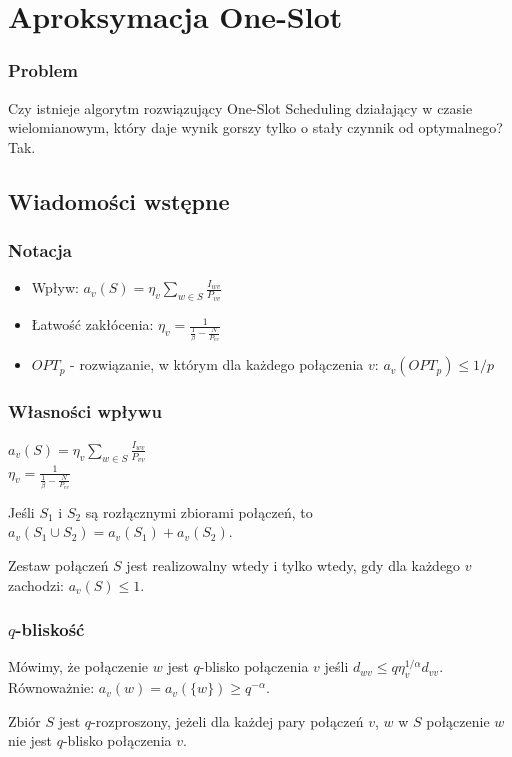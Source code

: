\documentclass[polish, t,10pt]{beamer}
\begin{document}
\section{Aproksymacja One-Slot}
\begin{frame}
    \frametitle{Problem}
        Czy istnieje algorytm rozwiązujący One-Slot Scheduling działający w czasie wielomianowym,
        który daje wynik gorszy tylko o stały czynnik od optymalnego?
        \pause
        \vfill
        Tak.
\end{frame}

\subsection{Wiadomości wstępne}
\begin{frame}
    \frametitle{Notacja}
    \begin{itemize}
        \item Wpływ: $a_v(S) = \eta_v \sum_{w \in S} \frac{I_{wv}}{P_{vv}}$
        \item Łatwość zakłócenia: $\eta_v = \frac{1}{\frac{1}{\beta} - \frac{N}{P_{vv}}}$
        \item $OPT_p$ - rozwiązanie, w którym dla każdego połączenia $v$: $a_v(OPT_p) \le 1/p$
    \end{itemize}
\end{frame}

\begin{frame}
    \frametitle{Własności wpływu}
    \begin{definition}
        $a_v(S) = \eta_v \sum_{w \in S} \frac{I_{wv}}{P_{vv}}$\\
        $\eta_v = \frac{1}{\frac{1}{\beta} - \frac{N}{P_{vv}}}$
    \end{definition}
    \begin{lemma}
        Jeśli $S_1$ i $S_2$ są rozłącznymi zbiorami połączeń, to $a_v(S_1 \cup S_2) = a_v(S_1) + a_v(S_2)$.
    \end{lemma}
    \begin{lemma}
        Zestaw połączeń $S$ jest realizowalny wtedy i tylko wtedy, gdy dla każdego $v$ zachodzi:
        $a_v(S) \le 1$.
    \end{lemma}
\end{frame}

\begin{frame}
    \frametitle{$q$-bliskość}
    \begin{definition}
        Mówimy, że połączenie $w$ jest $q$-blisko połączenia $v$ jeśli $d_{wv} \le q \eta_v^{1/\alpha} d_{vv}$.
        Równoważnie: $a_v(w) = a_v(\{w\}) \ge q^{-\alpha}$.
    \end{definition}

    \begin{definition}
        Zbiór $S$ jest $q$-rozproszony, jeżeli dla każdej pary połączeń $v$, $w$ w $S$ połączenie $w$ nie jest $q$-blisko połączenia $v$.
    \end{definition}
\end{frame}
\end{document}
